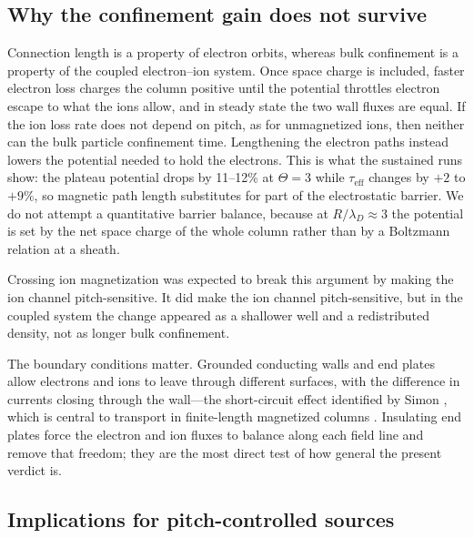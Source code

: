 \documentclass[11pt]{article}
\begin{document}
\subsection{Why the confinement gain does not survive}

Connection length is a property of electron orbits, whereas bulk confinement is a property of the coupled electron--ion system. Once space charge is included, faster electron loss charges the column positive until the potential throttles electron escape to what the ions allow, and in steady state the two wall fluxes are equal. If the ion loss rate does not depend on pitch, as for unmagnetized ions, then neither can the bulk particle confinement time. Lengthening the electron paths instead lowers the potential needed to hold the electrons. This is what the sustained runs show: the plateau potential drops by 11--12\% at $\Theta = 3$ while $\tau_{\mathrm{eff}}$ changes by $+2$ to $+9\%$, so magnetic path length substitutes for part of the electrostatic barrier. We do not attempt a quantitative barrier balance, because at $R/\lambda_D \approx 3$ the potential is set by the net space charge of the whole column rather than by a Boltzmann relation at a sheath.

Crossing ion magnetization was expected to break this argument by making the ion channel pitch-sensitive. It did make the ion channel pitch-sensitive, but in the coupled system the change appeared as a shallower well and a redistributed density, not as longer bulk confinement.

The boundary conditions matter. Grounded conducting walls and end plates allow electrons and ions to leave through different surfaces, with the difference in currents closing through the wall---the short-circuit effect identified by Simon \cite{simon1955}, which is central to transport in finite-length magnetized columns \cite{curreli2014}. Insulating end plates force the electron and ion fluxes to balance along each field line and remove that freedom; they are the most direct test of how general the present verdict is.

\subsection{Implications for pitch-controlled sources}
\end{document}
